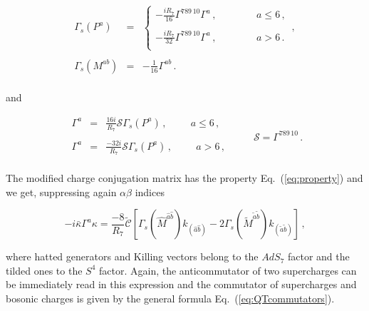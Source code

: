 \documentclass[12pt,a4paper]{article}
\begin{document}
\begin{equation}
  \begin{array}{rcl}
\Gamma_{s}(P^{a}) & = &
\left\{
  \begin{array}{ccc}
-\frac{iR_{7}}{16}\Gamma^{789\, 10}\Gamma^{a}\, ,& \hspace{1cm} & a\leq 6\, ,\\
& & \\
-\frac{iR_{7}}{32}\Gamma^{789\, 10}\Gamma^{a}\, ,& \hspace{1cm} & a> 6\, .\\
  \end{array}
\right.\, ,\\
& & \\
\Gamma_{s}(M^{ab}) & = & -\frac{1}{16}\Gamma^{ab}\, .\\
\end{array}
\end{equation}

\noindent
and

\begin{equation}
  \begin{array}{rcl}
\Gamma^{a} & = & {\textstyle\frac{16i}{R_{7}}}
\mathcal{S}\Gamma_{s}(P^{a})\, ,\hspace{1cm}a\leq 6\, ,\\
& & \\
\Gamma^{a} & = & {\textstyle\frac{-32i}{R_{7}}}
\mathcal{S}\Gamma_{s}(P^{a})\, ,\hspace{1cm}a> 6\, ,\\
  \end{array}
\hspace{1cm}
\mathcal{S}=\Gamma^{789\, 10}\, .
\end{equation}

The modified charge conjugation matrix has the property
Eq.~(\ref{eq:property}) and we get, suppressing again $\alpha\beta$
indices

\begin{equation}
-i\bar{\kappa}\Gamma^{a}\kappa = {\textstyle\frac{-8}{R_{7}}} 
\tilde{\mathcal{C}}[\Gamma_{s}(\hat{M}^{\hat{a}\hat{b}})k_{(\hat{a}\hat{b})}
-2\Gamma_{s}(\tilde{M}^{\tilde{a}\tilde{b}})
k_{(\tilde{a}\tilde{b})}]\, ,
\end{equation}

\noindent
where hatted generators and Killing vectors belong to the $AdS_{7}$
factor and the tilded ones to the $S^{4}$ factor. Again, the
anticommutator of two supercharges can be immediately read in this
expression and the commutator of supercharges and bosonic charges is
given by the general formula Eq.~(\ref{eq:QTcommutators}).
\end{document}
